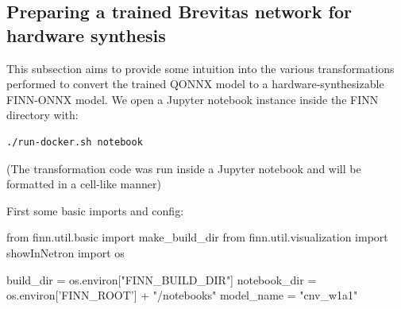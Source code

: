 \documentclass[11pt]{article}
\begin{document}
\subsection{Preparing a trained Brevitas network for hardware synthesis}
This subsection aims to provide some intuition into the various transformations performed to convert the trained QONNX model to a hardware-synthesizable FINN-ONNX model.
We open a Jupyter notebook instance inside the FINN directory with:
\begin{verbatim}
./run-docker.sh notebook
\end{verbatim}
(The transformation code was run inside a Jupyter notebook and will be formatted in a cell-like manner)

First some basic imports and config:
\begin{jupytercell}
from finn.util.basic import make_build_dir
from finn.util.visualization import showInNetron
import os

build_dir = os.environ["FINN_BUILD_DIR"]
notebook_dir = os.environ['FINN_ROOT'] + "/notebooks"
model_name = "cnv_w1a1"
\end{jupytercell}
\end{document}

